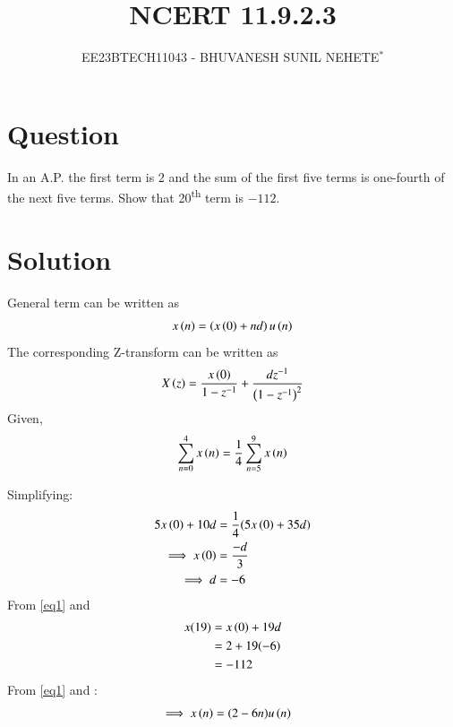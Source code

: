 \documentclass[journal,12pt,twocolumn]{IEEEtran}
\theoremstyle{remark}
\begin{document}

\vspace{3cm}

\title{NCERT 11.9.2.3}
\author{EE23BTECH11043 - BHUVANESH SUNIL NEHETE$^{*}$%
}
\maketitle
\newpage
\bigskip

\renewcommand{\thefigure}{\theenumi}
\renewcommand{\thetable}{\theenumi}



\section*{Question}

In an A.P. the first term is 2 and the sum of the first five terms is one-fourth of the next five terms. Show that 20\textsuperscript{th} term is $-112$.

\section*{Solution}



General term can be written as
\begin{align}
    x\left(n\right) = \left(x\left(0\right) + nd\right)u\left(n\right)
\end{align}
The corresponding Z-transform can be written as 
\begin{align}
    X\left(z\right) = \frac{x\left(0\right)}{1 - z^{-1}} + \frac{dz^{-1}}{\left(1 - z^{-1}\right)^{2}} \label{eq2}
\end{align}
Given, 
   \begin{align}
       \sum_{n=0}^{4}x\left(n\right) = \frac{1}{4}\sum_{n=5}^{9}x\left(n\right)
   \end{align}

Simplifying:
    \begin{align}
        5x\left(0\right) + 10d &= \frac{1}{4}(5x\left(0\right) + 35d)\\
        \implies x\left(0\right) &= \frac{-d}{3}\\
        \implies d &= -6 \label{eq1}
    \end{align}
    From \eqref{eq1} and 
    \begin{align}
        x(19)&=x\left(0\right)+19d\\
        &=2+19(-6)\\ 
        &= -112
    \end{align}
From \eqref{eq1} and :
    \begin{align}
        \implies x\left(n\right)&=(2-6n)u\left(n\right) \label{eq3}
    \end{align}
    
\end{document}

